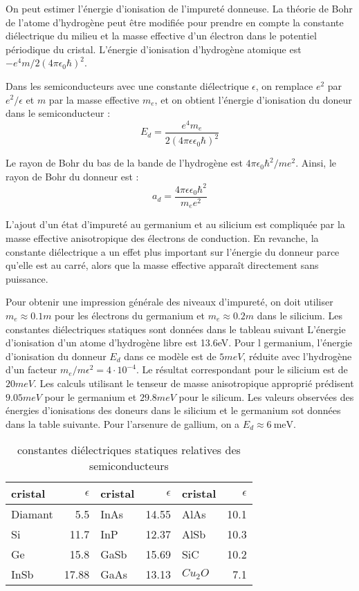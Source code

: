 On peut estimer l'énergie d'ionisation de l'impureté donneuse. La théorie de Bohr
de l'atome d'hydrogène peut être modifiée pour prendre en compte la constante
diélectrique du milieu et la masse effective d'un électron dans le potentiel
périodique du cristal. L'énergie d'ionisation d'hydrogène atomique est
$-e^4m/2(4\pi\epsilon_0\hbar)^2$.

Dans les semiconducteurs avec une constante diélectrique $\epsilon$, on remplace
$e^2$ par $e^2/\epsilon$ et $m$ par la masse effective $m_e$, et on obtient
l'énergie d'ionisation du doneur dans le semiconducteur :
\begin{equation}
    E_d = \frac{e^4 m_e}{2(4\pi\epsilon\epsilon_0 \hbar)^2}
\end{equation}

Le rayon de Bohr du bas de la bande de l'hydrogène est $4 \pi \epsilon_0\hbar^2 /
me^2$. Ainsi, le rayon de Bohr du donneur est :
\begin{equation}
    a_d = \frac{4 \pi \epsilon \epsilon_0 \hbar^2}{m_ee^2}
\end{equation}

L'ajout d'un état d'impureté au germanium et au silicium est compliquée par la
masse effective anisotropique des électrons de conduction. En revanche, la
constante diélectrique a un effet plus important sur l'énergie du donneur parce
qu'elle est au carré, alors que la masse effective apparaît directement sans
puissance.

Pour obtenir une impression générale des niveaux d'impureté, on doit utiliser
$m_e \approx 0.1m$ pour les électrons du germanium et $m_e \approx 0.2m$ dans le
silicium. Les constantes diélectriques statiques sont données dans le tableau
suivant L'énergie d'ionisation d'un atome d'hydrogène libre est 13.6eV. Pour l
germanium, l'énergie d'ionisation du donneur $E_d$ dans ce modèle est de $5meV$,
réduite avec l'hydrogène d'un facteur $m_e/m \epsilon^2 = 4\cdot 10^{-4}$. Le
résultat correspondant pour le silicium est de $20meV$. Les calculs utilisant le
tenseur de masse anisotropique approprié prédisent $9.05meV$ pour le germanium et
$29.8meV$ pour le silicum. Les valeurs observées des énergies d'ionisations des
doneurs dans le silicium et le germanium sot données dans la table suivante. Pour
l'arsenure de gallium, on a $E_d\approx \SI{6}{\milli\electronvolt}$.

\begin{table}[ht]
    \begin{tabularx}{\textwidth}{lRlRlR}
        \toprule
        cristal & $\epsilon$ & cristal & $\epsilon$ & cristal & $\epsilon$ \\
        \midrule
        Diamant & 5.5 & InAs & 14.55 & AlAs & 10.1 \\
        Si & 11.7 & InP & 12.37 & AlSb & 10.3 \\
        Ge & 15.8 & GaSb & 15.69 & SiC & 10.2 \\
        InSb & 17.88 & GaAs & 13.13 & $Cu_2O$ & 7.1\\
        \bottomrule
    \end{tabularx}
    \label{}
    \caption{constantes diélectriques statiques relatives des semiconducteurs}
\end{table}

